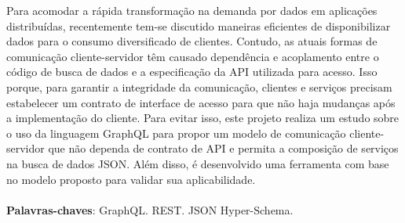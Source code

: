 \begin{resumo}
  Para acomodar a rápida transformação na demanda por dados em aplicações distribuídas, recentemente tem-se discutido maneiras eficientes de disponibilizar dados para o consumo diversificado de clientes. Contudo, as atuais formas de comunicação cliente-servidor têm causado dependência e acoplamento entre o código de busca de dados e a especificação da API utilizada para acesso. Isso porque, para garantir a integridade da comunicação, clientes e serviços precisam estabelecer um contrato de interface de acesso para que não haja mudanças após a implementação do cliente. Para evitar isso, este projeto realiza um estudo sobre o uso da linguagem GraphQL para propor um modelo de comunicação cliente-servidor que não dependa de contrato de API e permita a composição de serviços na busca de dados JSON. Além disso, é desenvolvido uma ferramenta com base no modelo proposto para validar sua aplicabilidade. \\ \\
  \textbf{Palavras-chaves}: GraphQL. REST. JSON Hyper-Schema.
\end{resumo}
